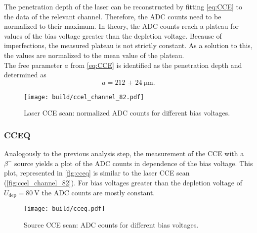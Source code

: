 The penetration depth of the laser can be reconstructed by fitting \autoref{eq:CCE} to the data of the relevant channel.
Therefore, the ADC counts need to be normalized to their maximum. In theory, the ADC counts reach a plateau for values of the bias voltage greater 
than the depletion voltage. Because of imperfections, the measured plateau is not strictly constant. As a solution to this, the values are normalized to the
mean value of the plateau. \\
The free parameter $a$ from \autoref{eq:CCE} is identified as the penetration depth and determined as
\begin{equation*}
    a = \qty{212(24)}{\micro\metre}.
\end{equation*}

\begin{figure}
    \centering
    \texttt{[image: build/ccel\_channel\_82.pdf]}
    \caption{Laser CCE scan: normalized ADC counts for different bias voltages.}
    \label{fig:ccel_channel_82}
\end{figure}

\subsubsection{CCEQ}
Analogously to the previous analysis step, the measurement of the CCE with a $\beta^-$ source yields a plot of the ADC counts in dependence of the bias voltage.
This plot, represented in \autoref{fig:cceq} is similar to the laser CCE scan (\autoref{fig:ccel_channel_82}). For bias voltages greater than
the depletion voltage of $U_\mathrm{dep} = \qty{80}{\volt}$ the ADC counts are mostly constant.
\begin{figure}
    \centering
    \texttt{[image: build/cceq.pdf]}
    \caption{Source CCE scan: ADC counts for different bias voltages.}
    \label{fig:cceq}
\end{figure}

